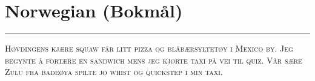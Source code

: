 \vspace{-1em}\section*{\checkno Norwegian (Bokmål)}
\vspace{-.5em}\hrule\vspace{.5em}
\noindent\textsc{
Høvdingens kjære squaw får litt pizza og blåbærsyltetøy i Mexico by.
Jeg begynte å fortære en sandwich mens jeg kjørte taxi på vei til quiz.
Vår sære Zulu fra badeøya spilte jo whist og quickstep i min taxi. 
}